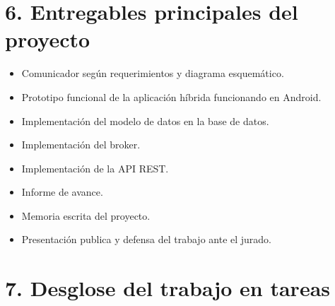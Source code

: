 \documentclass[
11pt, %
]{charter}
\begin{document}

\section{6. Entregables principales del proyecto}
\label{sec:entregables}


\begin{itemize}
	\item Comunicador según requerimientos y diagrama esquemático.
	\item Prototipo funcional de la aplicación híbrida funcionando en Android.
	\item Implementación del modelo de datos en la base de datos.
	\item Implementación del broker.
	\item Implementación de la API REST.
	\item Informe de avance.
	\item Memoria escrita del proyecto.
	\item Presentación publica y defensa del trabajo ante el jurado.
\end{itemize}


\section{7. Desglose del trabajo en tareas}
\label{sec:wbs}

\end{document}
